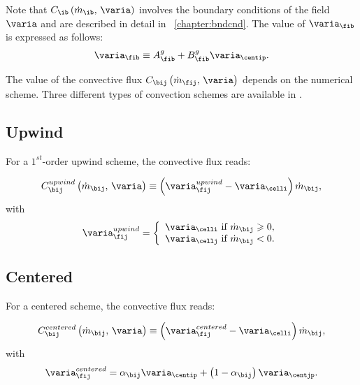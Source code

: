 Note that $C_\ib \left( \dot{m}_\ib , \, \varia \right)$ involves the boundary conditions of the field $\varia$
 and are described in detail in \chaptername~\ref{chapter:bndcnd}. The value of $\varia_{\fib}$ is expressed as follows:
\begin{equation}%
\varia_{\fib} \equiv A_{\fib}^g + B_{\fib}^g \varia_{\centip}.
\end{equation}

The value of the convective flux $ C_{\bij} \left(\dot{m}_\fij , \, \varia \right) $ depends on the numerical scheme. Three different types of convection schemes are available in \CS.

\subsection{Upwind}
For a $1^{st}$-order upwind scheme, the convective flux reads:

\begin{equation}
C_{\bij}^{upwind} \left( \dot{m}_{\bij} , \, \varia \right)  \equiv \left(\varia_{\fij}^{upwind} - \varia_{\celli} \right) \dot{m}_{\bij},
\end{equation}
with
\begin{equation}
\varia_{\fij}^{upwind} =
\left\lbrace\begin{array}{l}
\varia_\celli \text{ if } \dot{m}_{\bij}  \geqslant 0,\\
\varia_\cellj \text{ if } \dot{m}_{\bij} < 0.
\end{array}\right.
\end{equation}


\subsection{Centered}
For a centered scheme, the convective flux reads:

\begin{equation}
C_{\bij}^{centered} \left( \dot{m}_{\bij} , \, \varia \right)  \equiv \left(\varia_\fij^{centered} - \varia_{\celli} \right) \dot{m}_{\bij} ,
\end{equation}
with
\begin{equation}
\varia_\fij^{centered} = \alpha_{\bij} \varia_{\centip} + \left( 1 - \alpha_{\bij} \right) \varia_{\centjp}.
\end{equation}


